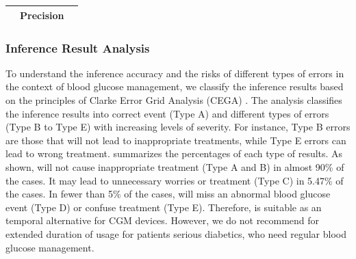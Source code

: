 \begin{table}[h]
\begin{tabular}{|c|c|c|c|c|l|l|}
\multicolumn{1}{|l|}{}                                                           & \multicolumn{4}{c|}{\textbf{Precision}}                                                                                 & \multicolumn{2}{l|}{}                                                                             \\ \hline
\end{tabular}
\end{table}


\subsubsection{Inference Result Analysis}
\label{subsec:predict_result_analysis}
To understand the inference accuracy and the risks of different types of errors in the context of blood glucose management, we classify the inference results based on the principles of Clarke Error Grid Analysis (CEGA) \cite{bib:DTT05:Clarke}.
The analysis classifies the inference results into correct event (Type A) and different types of errors (Type B to Type E) with increasing levels of severity.
For instance, Type B errors are those that will not lead to inappropriate treatments, while Type E errors can lead to wrong treatment.
 summarizes the percentages of each type of results.
As shown, \sysname will not cause inappropriate treatment (Type A and B) in almost 90\% of the cases.
It may lead to unnecessary worries or treatment (Type C) in 5.47\% of the cases.
In fewer than 5\% of the cases, \sysname will miss an abnormal blood glucose event (Type D) or confuse treatment (Type E).
Therefore, \sysname is suitable as an temporal alternative for CGM devices.
However, we do not recommend \sysname for extended duration of usage for patients serious diabetics, who need regular blood glucose management.

